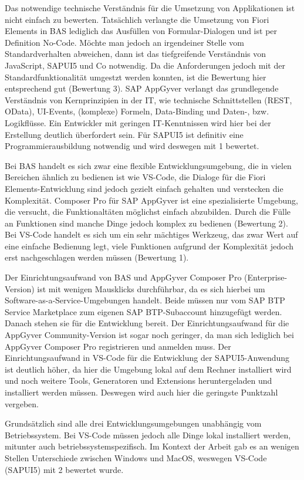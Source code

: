 Das notwendige technische Verständnis für die Umsetzung von Applikationen ist nicht einfach zu bewerten. Tatsächlich verlangte die Umsetzung von Fiori Elements in BAS lediglich das Ausfüllen von Formular-Dialogen und ist per Definition No-Code. Möchte man jedoch an irgendeiner Stelle vom Standardverhalten abweichen, dann ist das tiefgreifende Verständnis von JavaScript, SAPUI5 und Co notwendig. Da die Anforderungen jedoch mit der Standardfunktionalität umgestzt werden konnten, ist die Bewertung hier entsprechend gut (Bewertung 3). SAP AppGyver verlangt das grundlegende Verständnis von Kernprinzipien in der IT, wie technische Schnittstellen (REST, OData), UI-Events, (komplexe) Formeln, Data-Binding und Daten-, bzw. Logikflüsse. Ein Entwickler mit geringen IT-Kenntnissen wird hier bei der Erstellung deutlich überfordert sein. Für SAPUI5 ist definitiv eine Programmierausbildung notwendig und wird deswegen mit 1 bewertet.

Bei BAS handelt es sich zwar eine flexible Entwicklungsumgebung, die in vielen Bereichen ähnlich zu bedienen ist wie VS-Code, die Dialoge für die Fiori Elements-Entwicklung sind jedoch gezielt einfach gehalten und verstecken die Komplexität. Composer Pro für SAP AppGyver ist eine spezialisierte Umgebung, die versucht, die Funktionaltäten möglichst einfach abzubilden. Durch die Fülle an Funktionen sind manche Dinge jedoch komplex zu bedienen (Bewertung 2). Bei VS-Code handelt es sich um ein sehr mächtiges Werkzeug, das zwar Wert auf eine einfache Bedienung legt, viele Funktionen aufgrund der Komplexität jedoch erst nachgeschlagen werden müssen (Bewertung 1).

Der Einrichtungsaufwand von BAS und AppGyver Composer Pro (Enterprise-Version) ist mit wenigen Mausklicks durchführbar, da es sich hierbei um Software-as-a-Service-Umgebungen handelt. Beide müssen nur vom SAP BTP Service Marketplace zum eigenen SAP BTP-Subaccount hinzugefügt werden. Danach stehen sie für die Entwicklung bereit. Der Einrichtungsaufwand für die AppGyver Community-Version ist sogar noch geringer, da man sich lediglich bei AppGyver Composer Pro registrieren und anmelden muss. Der Einrichtungsaufwand in VS-Code für die Entwicklung der SAPUI5-Anwendung ist deutlich höher, da hier die Umgebung lokal auf dem Rechner installiert wird und noch weitere Tools, Generatoren und Extensions heruntergeladen und installiert werden müssen. Deswegen wird auch hier die geringste Punktzahl vergeben.

Grundsätzlich sind alle drei Entwicklungsumgebungen unabhängig vom Betriebssystem. Bei VS-Code müssen jedoch alle Dinge lokal installiert werden, mitunter auch betriebssystemspezifisch. Im Kontext der Arbeit gab es an wenigen Stellen Unterschiede zwischen Windows und MacOS, weswegen VS-Code (SAPUI5) mit 2 bewertet wurde.

